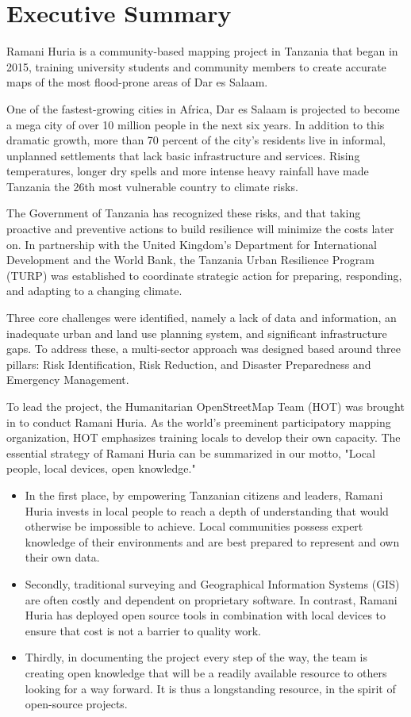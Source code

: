 \documentclass[a4paper,12pt,twoside]{article}
\begin{document}
\newpage
\section{Executive Summary}
\label{executivesummary}

Ramani Huria is a community-based mapping project in Tanzania that began in 2015, training university students and community members to create accurate maps of the most flood-prone areas of Dar es Salaam. 

One of the fastest-growing cities in Africa, Dar es Salaam is projected to become a mega city of over 10 million people in the next six years. In addition to this dramatic growth, more than 70 percent of the city's residents live in informal, unplanned settlements that lack basic infrastructure and services. Rising temperatures, longer dry spells and more intense heavy rainfall have made Tanzania the 26th most vulnerable country to climate risks. 

The Government of Tanzania has recognized these risks, and that taking proactive and preventive actions to build resilience will minimize the costs later on. In partnership with the United Kingdom's Department for International Development and the World Bank, the Tanzania Urban Resilience Program (TURP) was established to coordinate strategic action for preparing, responding, and adapting to a changing climate.

Three core challenges were identified, namely a lack of data and information, an inadequate urban and land use planning system, and significant infrastructure gaps. To address these, a multi-sector approach was designed based around three pillars: Risk Identification, Risk Reduction, and Disaster Preparedness and Emergency Management. 

To lead the project, the Humanitarian OpenStreetMap Team (HOT) was brought in to conduct Ramani Huria. As the world's preeminent participatory mapping organization, HOT emphasizes training locals to develop their own capacity. The essential strategy of Ramani Huria can be summarized in our motto, "Local people, local devices, open knowledge."
\begin{itemize}
    \item In the first place, by empowering Tanzanian citizens and leaders, Ramani Huria invests in local people to reach a depth of understanding that would otherwise be impossible to achieve. Local communities possess expert knowledge of their environments and are best prepared to represent and own their own data. 
    \item Secondly, traditional surveying and Geographical Information Systems (GIS) are often costly and dependent on proprietary software. In contrast, Ramani Huria has deployed open source tools in combination with local devices to ensure that cost is not a barrier to quality work. 
    \item Thirdly, in documenting the project every step of the way, the team is creating open knowledge that will be a readily available resource to others looking for a way forward. It is thus a longstanding resource, in the spirit of open-source projects. 
\end{itemize}
\end{document}

